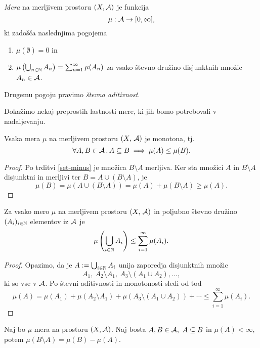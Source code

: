 \begin{definicija}
    \emph{Mera} na merljivem prostoru \((X, \mathcal{A})\) je funkcija 
    \[\mu: \mathcal{A} \to [0, \infty],\]
    ki zadošča naslednjima pogojema
    \begin{enumerate}
        \item \(\mu(\emptyset) = 0\) in
        \item \(\mu\left(\bigcup_{n \in \mathbb{N}} A_n\right) = \sum_{n=1}^{\infty} \mu(A_n)\) za vsako števno družino disjunktnih množic \(A_n \in \mathcal{A}\).
    \end{enumerate}
    Drugemu pogoju pravimo \emph{števna aditivnost}.
\end{definicija}

Dokažimo nekaj preprostih lastnosti mere, ki jih bomo potrebovali v nadaljevanju.
\begin{trditev}
    \label{mera-mon}
    Vsaka mera \(\mu\) na merljivem prostoru \((X,\, \mathcal{A})\) je monotona, tj.
    \[\forall A, B \in \mathcal{A} \,.\, A \subseteq B \implies \mu(A) \leq \mu(B).\]
\end{trditev}

\begin{proof}
    Po trditvi \ref{set-minus} je množica \(B \setminus A\) merljiva. Ker sta množici \(A\) in \(B \setminus A\) disjunktni in merljivi ter \(B = A \cup (B \setminus A)\), je 
    \[
    \mu(B) = \mu(A \cup (B \setminus A)) = \mu(A) + \mu(B \setminus A) \geq \mu(A).\]
\end{proof}

\begin{trditev}
    Za vsako mero \(\mu\) na merljivem prostoru \((X,\, \mathcal{A})\) in poljubno števno družino \((A_i)_{i \in \mathbb{N}}\) elementov iz \(\mathcal{A}\) je 
    \[\mu\left(\bigcup_{i \in \mathbb{N}} A_i\right) \leq \sum_{i=1}^{\infty} \mu(A_i).\]
\end{trditev}

\begin{proof}
    Opazimo, da je \(A := \bigcup_{i \in \mathbb{N}} A_i\) unija zaporedja disjunktnih množic
    \[A_1,\ A_2 \setminus A_1,\ A_3 \setminus (A_1 \cup A_2), \ldots,\]
    ki so vse v \(\mathcal{A}\). Po števni aditivnosti in monotonosti sledi od tod
    \[\mu(A) = \mu(A_1) + \mu(A_2 \setminus A_1) + \mu(A_3 \setminus (A_1 \cup A_2)) + \cdots \leq \sum_{i=1}^{\infty} \mu(A_i).\]
\end{proof}

\begin{trditev}
    \label{mera-minus}
    Naj bo \(\mu\) mera na prostoru \((X, \mathcal{A})\). Naj bosta \(A, B \in \mathcal{A},\ A \subseteq B\) in \(\mu(A) < \infty\), potem \(\mu(B \setminus A) = \mu(B) - \mu(A)\).
\end{trditev}

